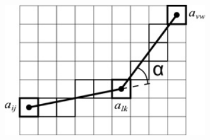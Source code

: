\documentclass[default]{beamer}
\begin{document}
\begin{frame}
\begin{columns}
\begin{column}{0.4\textwidth}
\begin{figure}
				\end{figure}
				\begin{figure}
					\includegraphics[width=0.8\textwidth]{plan_3.jpg}
				\end{figure}
			\end{column}
		\end{columns}
	\end{frame}
	
\end{document}
